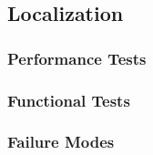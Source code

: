 
\subsection{Localization}
\label{sec:verification_localization}

\subsubsection{Performance Tests}
\label{sec:localization_pt}

\subsubsection{Functional Tests}
\label{sec:localization_ft}

\subsubsection{Failure Modes}
\label{sec:localization_fm}
